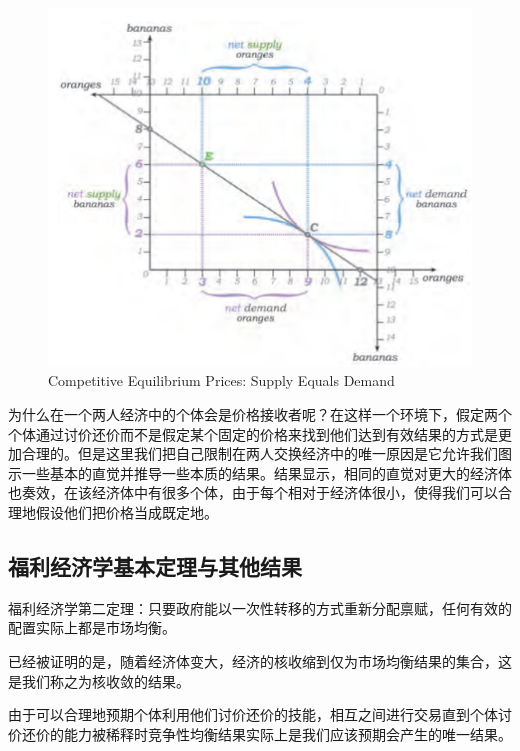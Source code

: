 \documentclass{article}
\begin{document}
\begin{figure}[H] %
	\centering %
	\includegraphics[width=1\textwidth]{16_3} %
	\caption{Competitive Equilibrium Prices: Supply Equals Demand} %
	\label{Fig.main4} %
\end{figure}

为什么在一个两人经济中的个体会是价格接收者呢？在这样一个环境下，假定两个个体通过讨价还价而不是假定某个固定的价格来找到他们达到有效结果的方式是更加合理的。但是这里我们把自己限制在两人交换经济中的唯一原因是它允许我们图示一些基本的直觉并推导一些本质的结果。结果显示，相同的直觉对更大的经济体也奏效，在该经济体中有很多个体，由于每个相对于经济体很小，使得我们可以合理地假设他们把价格当成既定地。

\subsection{福利经济学基本定理与其他结果}

福利经济学第二定理：只要政府能以一次性转移的方式重新分配禀赋，任何有效的配置实际上都是市场均衡。

已经被证明的是，随着经济体变大，经济的核收缩到仅为市场均衡结果的集合，这是我们称之为核收敛的结果。

由于可以合理地预期个体利用他们讨价还价的技能，相互之间进行交易直到个体讨价还价的能力被稀释时竞争性均衡结果实际上是我们应该预期会产生的唯一结果。
\end{document}
